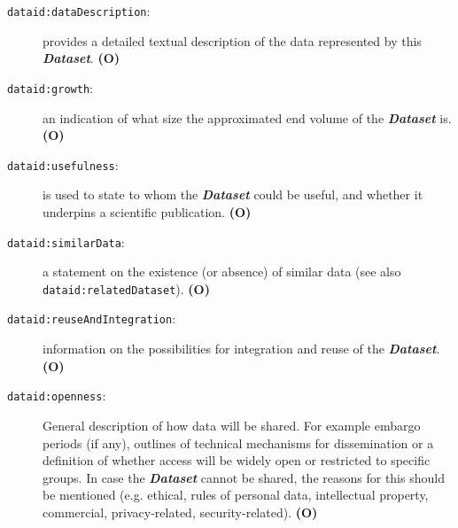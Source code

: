 \documentclass[a4paper,english,twoside,BCOR1.5cm,headsepline,DIV12,appendixprefix,final,12pt]{scrbook}
\newcommand{\prop}[1]{{{\texttt{#1}}}}
\newcommand{\important}[1]{\textbf{\textit{#1}}}
\begin{document}
\begin{description}
\item[\prop{dataid:dataDescription}:] provides a detailed textual description of the data represented by this \important{Dataset}. \textbf{(O)}
\item[\prop{dataid:growth}:] an indication of what size the approximated end volume of the \important{Dataset} is. \textbf{(O)}
\item[\prop{dataid:usefulness}:] is used to state to whom the \important{Dataset} could be useful, and whether it underpins a scientific publication. \textbf{(O)}
\item[\prop{dataid:similarData}:] a statement on the existence (or absence) of similar data (see also \prop{dataid:relatedDataset}). \textbf{(O)}
\item[\prop{dataid:reuseAndIntegration}:] information on the possibilities for integration and reuse of the \important{Dataset}. \textbf{(O)}
\item[\prop{dataid:openness}:] General description of how data will be shared. For example embargo periods (if any), outlines of technical mechanisms for dissemination or a definition of whether access will be widely open or restricted to specific groups. In case the \important{Dataset} cannot be shared, the reasons for this should be mentioned (e.g. ethical, rules of personal data, intellectual property, commercial, privacy-related, security-related). \textbf{(O)}
\end{description}
\end{document}
